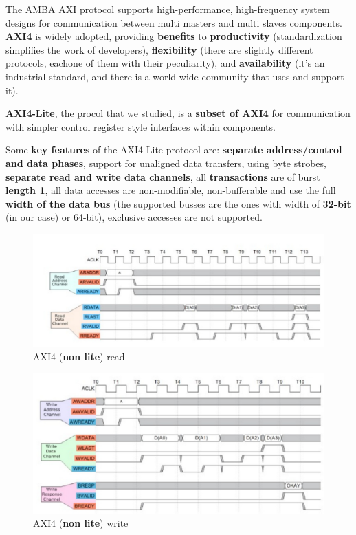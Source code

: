 {}

The AMBA AXI protocol supports high-performance, high-frequency system designs for communication between
multi masters and multi slaves components.
{\bf AXI4} is widely adopted, providing {\bf benefits} to {\bf productivity} (standardization simplifies the work of developers), {\bf flexibility} (there are slightly different protocols, eachone of them with their peculiarity), and {\bf availability} (it's an industrial standard, and there is a world wide community that uses and support it).
\newline

{\bf AXI4-Lite}, the procol that we studied, is a {\bf subset of AXI4} for communication with simpler control register style interfaces within components.
\newline

Some {\bf key features} of the AXI4-Lite protocol are: {\bf separate address/control and data phases}, support for unaligned data transfers, using byte strobes, {\bf separate read and write data channels}, all {\bf transactions} are of burst {\bf length 1}, all data accesses are non-modifiable, non-bufferable and use the full {\bf width of the data bus} (the supported busses are the ones with width of {\bf 32-bit} (in our case) or 64-bit), exclusive accesses are not supported.

\begin{figure}[!ht]
\includegraphics[width=1\textwidth]{./../../img/Images/axi_simple_read}
\caption{AXI4 ({\bf non lite}) read}
\label{simple_read}
\end{figure}
\begin{figure}[!ht]
\includegraphics[width=1\textwidth]{./../../img/Images/axi_simple_write}
\caption{AXI4 ({\bf non lite}) write}
\label{simple_write}
\end{figure}

